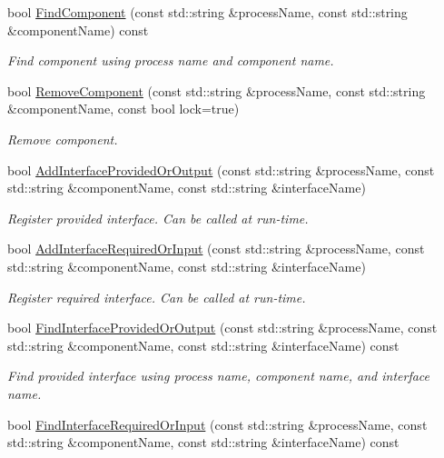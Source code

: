 \begin{DoxyCompactItemize}
bool \hyperlink{classmts_manager_global_a9381aad00498adae5fdf9488b6a749bc}{Find\-Component} (const std\-::string \&process\-Name, const std\-::string \&component\-Name) const 
\begin{DoxyCompactList}\small\item\em Find component using process name and component name. \end{DoxyCompactList}\item 
bool \hyperlink{classmts_manager_global_ad54d697f17391d0bd203ec66f33ef47c}{Remove\-Component} (const std\-::string \&process\-Name, const std\-::string \&component\-Name, const bool lock=true)
\begin{DoxyCompactList}\small\item\em Remove component. \end{DoxyCompactList}\item 
bool \hyperlink{classmts_manager_global_a78430c06228bba8577979f6bec9b8301}{Add\-Interface\-Provided\-Or\-Output} (const std\-::string \&process\-Name, const std\-::string \&component\-Name, const std\-::string \&interface\-Name)
\begin{DoxyCompactList}\small\item\em Register provided interface. Can be called at run-\/time. \end{DoxyCompactList}\item 
bool \hyperlink{classmts_manager_global_a26ed00e3c915e50262f13fb21ec4e621}{Add\-Interface\-Required\-Or\-Input} (const std\-::string \&process\-Name, const std\-::string \&component\-Name, const std\-::string \&interface\-Name)
\begin{DoxyCompactList}\small\item\em Register required interface. Can be called at run-\/time. \end{DoxyCompactList}\item 
bool \hyperlink{classmts_manager_global_a117115d1bdee6acb13a307eb88e48e46}{Find\-Interface\-Provided\-Or\-Output} (const std\-::string \&process\-Name, const std\-::string \&component\-Name, const std\-::string \&interface\-Name) const 
\begin{DoxyCompactList}\small\item\em Find provided interface using process name, component name, and interface name. \end{DoxyCompactList}\item 
bool \hyperlink{classmts_manager_global_a801480ff0373d7637abc45ce194c3be8}{Find\-Interface\-Required\-Or\-Input} (const std\-::string \&process\-Name, const std\-::string \&component\-Name, const std\-::string \&interface\-Name) const 

\end{DoxyCompactItemize}
